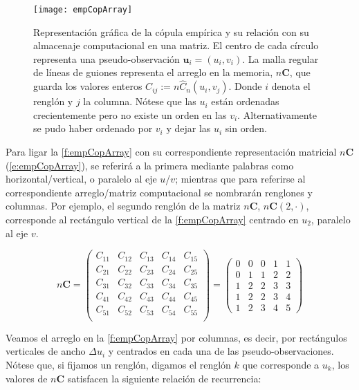 \begin{figure}
	\centering
	\texttt{[image: empCopArray]}
	\caption{Representaci\'on gr\'afica de la c\'opula emp\'irica y su relaci\'on con su almacenaje computacional en una matriz. El centro de cada c\'irculo representa una pseudo-observaci\'on $\mathbf{u}_i = (u_i,v_i)$. La malla regular de l\'ineas de guiones representa el arreglo en la memoria, $n\mathbf{C}$, que guarda los valores enteros $C_{ij}:=n\hat{C}_n(u_i, v_j)$. Donde $i$ denota el rengl\'on y $j$ la columna.
N\'otese que las $u_i$ est\'an ordenadas crecientemente pero no existe un orden en las $v_i$. Alternativamente se pudo haber ordenado por $v_i$ y dejar las $u_i$ sin orden.}
	\label{f:empCopArray}
\end{figure}

Para ligar la \autoref{f:empCopArray} con su correspondiente representaci\'on matricial $n\mathbf{C}$ (\autoref{e:empCopArray}), se referir\'a a la primera mediante palabras como horizontal/vertical, o paralelo al eje $u$/$v$; mientras que para referirse al correspondiente arreglo/matriz computacional se nombrar\'an renglones y columnas. Por ejemplo, el segundo rengl\'on de la matriz $n\mathbf{C}$, $n\mathbf{C}(2,\cdot)$, corresponde al rect\'angulo vertical de la \autoref{f:empCopArray} centrado en $u_2$, paralelo al eje $v$.

\begin{equation}
	n\mathbf{C} =
		\begin{pmatrix}
			C_{11} & C_{12} & C_{13} & C_{14} & C_{15}\\
			C_{21} & C_{22} & C_{23} & C_{24} & C_{25}\\
			C_{31} & C_{32} & C_{33} & C_{34} & C_{35}\\
			C_{41} & C_{42} & C_{43} & C_{44} & C_{45}\\
			C_{51} & C_{52} & C_{53} & C_{54} & C_{55}\\
		\end{pmatrix}
		=
		\begin{pmatrix}
			0 & 0 & 0 & 1 & 1\\
			0 & 1 & 1 & 2 & 2\\
			1 & 2 & 2 & 3 & 3\\
			1 & 2 & 2 & 3 & 4\\
			1 & 2 & 3 & 4 & 5
		\end{pmatrix}
	\label{e:empCopArray}
\end{equation}

Veamos el arreglo en la \autoref{f:empCopArray} por columnas, es decir, por rect\'angulos verticales de ancho $\Delta u_i$ y centrados en cada una de las pseudo-observaciones. 
N\'otese que, si fijamos un rengl\'on, digamos el rengl\'on $k$ que corresponde a $u_k$, los valores de $n\mathbf{C}$ satisfacen la siguiente relaci\'on de recurrencia:

